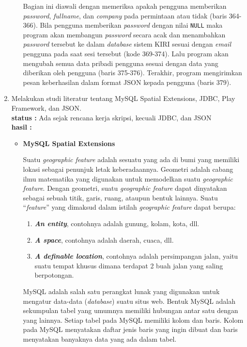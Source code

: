 \documentclass[a4paper,twoside]{article}
\begin{document}
\begin{enumerate}
\begin{itemize}
Bagian ini diawali dengan memeriksa apakah pengguna memberikan \textit{password}, \textit{fullname}, dan \textit{company} pada permintaan atau tidak (baris 364-366). Bila pengguna memberikan \textit{password} dengan nilai \texttt{NULL} maka program akan membangun \textit{password} secara acak dan menambahkan \textit{password} tersebut ke dalam \textit{database} sistem KIRI sesuai dengan \textit{email} pengguna pada saat sesi tersebut (kode 369-374). Lalu program akan mengubah semua data pribadi pengguna sesuai dengan data yang diberikan oleh pengguna (baris 375-376). Terakhir, program mengirimkan pesan keberhasilan dalam format JSON kepada pengguna (baris 379).

\end{itemize}

		
		\item Melakukan studi literatur tentang MySQL Spatial Extensions, JDBC, Play Framework, dan JSON.\\
		{\bf status :} Ada sejak rencana kerja skripsi, kecuali JDBC, dan JSON\\
		{\bf hasil :}
		
		\begin{itemize}
			\item \textbf{MySQL Spatial Extensions}

	Suatu \textit{geographic feature}\cite{mysqlspatial} adalah sesuatu yang ada di bumi yang memiliki lokasi sebagai penunjuk letak keberadaannya. Geometri adalah cabang ilmu matematika yang digunakan untuk memodelkan suatu \textit{geographic feature}. Dengan geometri, suatu \textit{geographic feature} dapat dinyatakan sebagai sebuah titik, garis, ruang, ataupun bentuk lainnya. Suatu ``\textit{feature}'' yang dimaksud dalam istilah \textit{geographic feature} dapat berupa:
	\begin{enumerate}
		\item \textbf{\textit{An entity}}, contohnya adalah gunung, kolam, kota, dll.
		\item \textbf{\textit{A space}}, contohnya adalah daerah, cuaca, dll.
		\item \textbf{\textit{A definable location}}, contohnya adalah persimpangan jalan, yaitu suatu tempat khusus dimana terdapat 2 buah jalan yang saling berpotongan.
	\end{enumerate}
	
	MySQL adalah salah satu perangkat lunak yang digunakan untuk mengatur data-data (\textit{database}) suatu situs web. Bentuk MySQL adalah sekumpulan tabel yang umumnya memiliki hubungan antar satu dengan yang lainnya. Setiap tabel pada MySQL memiliki kolom dan baris. Kolom pada MySQL menyatakan daftar jenis baris yang ingin dibuat dan baris menyatakan banyaknya data yang ada dalam tabel.
	

\end{itemize}
\end{enumerate}
\end{document}

